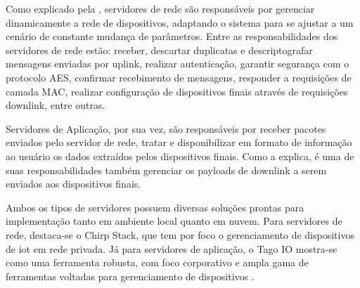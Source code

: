 Como explicado pela , servidores de rede são responsáveis por 
gerenciar dinamicamente a rede de dispositivos, adaptando o sistema para se ajustar a um cenário
de constante mudança de parâmetros. Entre as responsabilidades dos servidores de rede estão: 
receber, descartar duplicatas e descriptografar mensagens enviadas por uplink, 
realizar autenticação, garantir segurança com o protocolo AES,
confirmar recebimento de mensagens, responder a requisições de camada MAC, realizar configuração de 
dispositivos finais através de requisições downlink, entre outras. 

Servidores de Aplicação, por sua vez, são responsáveis por receber 
pacotes enviados pelo servidor de rede, tratar e disponibilizar
em formato de informação ao usuário os dados 
extraídos pelos dispositivos finais. Como a  explica,
é uma de suas responsabilidades também gerenciar os \gls{payload}s de 
downlink a serem enviados aos dispositivos finais.

Ambos os tipos de servidores possuem diversas soluções
prontas para implementação tanto em ambiente local quanto em nuvem.
Para servidores de rede, destaca-se o Chirp Stack, 
que tem por foco o gerenciamento de dispositivos de \gls{iot} em rede privada.
Já para servidores de aplicação, o Tago IO mostra-se como uma ferramenta robusta,
com foco corporativo e ampla gama de ferramentas 
voltadas para gerenciamento de dispositivos \cite{Camargo2022}.
